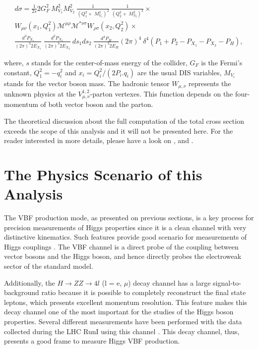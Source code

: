 \begin{eqnarray}
\nonumber
d\sigma = \frac{1}{2s}2G_{F}^{2}~M_{V_{1}}^{2}M_{V_{2}}^{2}~\frac{1}{(Q_{1}^{2}+~M_{V_{1}}^{2})^{2}}~\frac{1}{(Q_{2}^{2}+~M_{V_{2}}^{2})^{2}}\times\\
\nonumber
W_{\mu\nu}(x_{1},Q_{1}^{2})\mathcal{M}^{\mu\rho}\mathcal{M}^{*\nu\sigma}W_{\rho\sigma}(x_{2},Q_{2}^{2})\times\\ \frac{d^{3}P_{X_{1}}}{(2\pi)^{3}2E_{X_{1}}}~\frac{d^{3}P_{X_{2}}}{(2\pi)^{3}2E_{X_{2}}}~ds_{1}ds_{2}~\frac{d^{3}P_{H}}{(2\pi)^{3}2E_{H}}
(2\pi)^{4}~\delta^{4}(P_{1}+P_{2}-P_{X_{1}}-P_{X_{2}}-P_{H}),
\label{eq:vbf_dis_differential_XS}
\end{eqnarray}

where, $s$ stands for the center-of-mass energy of the collider, $G_{F}$ is the Fermi's constant, $Q_{1}^{2} = -q_{i}^{2}$ and $x_{i} = Q_{i}^{2}/(2P_{i}.q_{i})$ are the usual DIS variables, $M_{V_{i}}$ stands for the vector boson mass. The hadronic tensor $W_{\mu,\nu}$ represents the unknown physics at the $V_{\mu,\nu}^{1,2}$-parton vertexes. This function depends on the four-momentum of both vector boson and the parton. 

The theoretical discussion about the full computation of the total cross section exceeds the scope of this analysis and it will not be presented here. For the reader interested in more details, please have a look on \cite{bib:PhysRep457-1-2005}, \cite{bib:PhysRevLett69-3274-1992} and \cite{bib:PhysRevLett105-011801-2010}.


\section{The Physics Scenario of this Analysis}
The VBF production mode, as presented on previous sections, is a key process for precision measurements of Higgs properties since it is a clean channel with very distinctive kinematics. Such features provide good scenario for measurements of Higgs couplings \cite{bib:PhysRevD62_013009_2000}. The VBF channel is a direct probe of the coupling between vector bosons and the Higgs boson, and hence directly probes the electroweak sector of the standard model.

Additionally, the $H \rightarrow ZZ \rightarrow 4l$ (l = e, $\mu$) decay channel has a large signal-to-background ratio because it is possible to completely reconstruct the final state leptons, which presents excellent momentum resolution. This feature makes this decay channel one of the most important for the studies of the Higgs boson properties. Several different measurements have been performed with the data collected during the LHC RunI using this channel
\cite{bib:PhysRevLett110-081803-2013,bib:PhysRevD89-092007-2014,bib:PhysLettB-736-64-2014,bib:PhysRevD92-012004-2015,bib:PhysRevD92-072010-2015}. This decay channel, thus, presents a good frame to measure Higgs VBF production.

